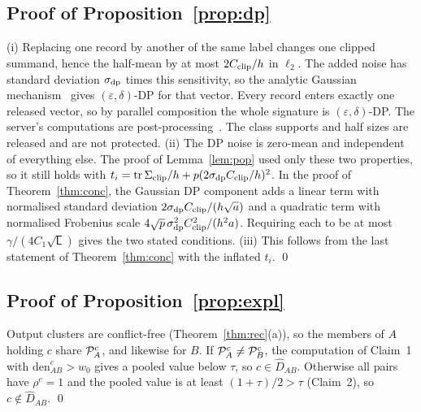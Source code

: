 \subsection{Proof of Proposition~\ref{prop:dp}}
(i) Replacing one record by another of the same label changes one clipped summand, hence the half-mean by at most $2C_{\rm clip}/h$ in $\ell_2$. The added noise has standard deviation $\sigma_{\rm dp}$ times this sensitivity, so the analytic Gaussian mechanism~\citep{balle2018analytic} gives $(\varepsilon,\delta)$-DP for that vector. Every record enters exactly one released vector, so by parallel composition the whole signature is $(\varepsilon,\delta)$-DP. The server's computations are post-processing~\citep{dwork2014dp}. The class supports and half sizes are released and are not protected. (ii) The DP noise is zero-mean and independent of everything else. The proof of Lemma~\ref{lem:pop} used only these two properties, so it still holds with $t_i=\operatorname{tr}\Sigma_{\rm clip}/h+p(2\sigma_{\rm dp}C_{\rm clip}/h)^2$. In the proof of Theorem~\ref{thm:conc}, the Gaussian DP component adds a linear term with normalised standard deviation $2\sigma_{\rm dp}C_{\rm clip}/(h\sqrt a)$ and a quadratic term with normalised Frobenius scale $4\sqrt p\,\sigma^2_{\rm dp}C^2_{\rm clip}/(h^2a)$. Requiring each to be at most $\gamma/(4C_1\sqrt{\mathsf L})$ gives the two stated conditions. (iii) This follows from the last statement of Theorem~\ref{thm:conc} with the inflated $t_i$. \qed

\subsection{Proof of Proposition~\ref{prop:expl}}
Output clusters are conflict-free (Theorem~\ref{thm:rec}(a)), so the members of $A$ holding $c$ share $\mathcal{P}_A^c$, and likewise for $B$. If $\mathcal{P}_A^c\neq\mathcal{P}_B^c$, the computation of Claim~1 with $\mathrm{den}^c_{AB}>w_0$ gives a pooled value below $\tau$, so $c\in\hat D_{AB}$. Otherwise all pairs have $\rho^c=1$ and the pooled value is at least $(1+\tau)/2>\tau$ (Claim~2), so $c\notin\hat D_{AB}$. \qed
